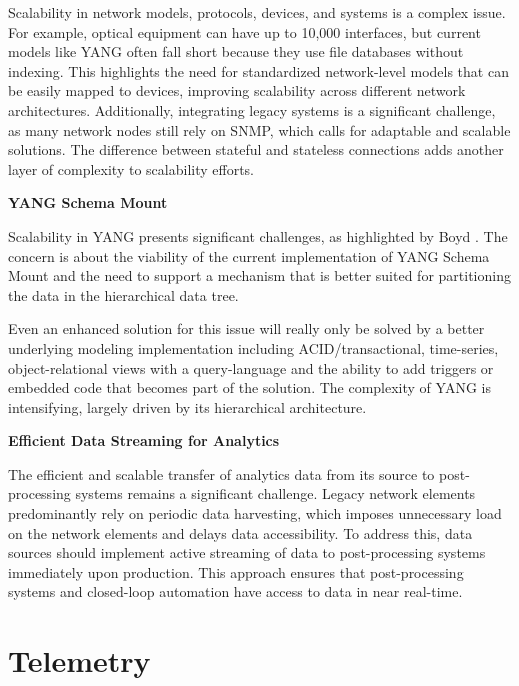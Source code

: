 \documentclass[10pt,sigconf]{iabart}
\begin{document}
Scalability in network models, protocols, devices, and systems is a complex issue. For example, optical equipment can have up to 10,000 interfaces, but current models like YANG often fall short because they use file databases without indexing. This highlights the need for standardized network-level models that can be easily mapped to devices, improving scalability across different network architectures. Additionally, integrating legacy systems is a significant challenge, as many network nodes still rely on SNMP, which calls for adaptable and scalable solutions. The difference between stateful and stateless connections adds another layer of complexity to scalability efforts.
 

\textbf{YANG Schema Mount}

Scalability in YANG presents significant challenges, as highlighted by Boyd \cite{boyd2023scalable}. The concern is about the viability of the current implementation of YANG Schema Mount \cite{RFC8528} and the need to support a mechanism that is better suited for partitioning the data in the hierarchical data tree.

Even an enhanced solution for this issue will really only be solved by a better underlying modeling implementation including ACID/transactional, time-series, object-relational views with a query-language and the ability to add triggers or embedded code that becomes part of the solution. The complexity of YANG is intensifying, largely driven by its hierarchical architecture.

\textbf{Efficient Data Streaming for Analytics}

The efficient and scalable transfer of analytics data from its source to post-processing systems remains a significant challenge. Legacy network elements predominantly rely on periodic data harvesting, which imposes unnecessary load on the network elements and delays data accessibility. To address this, data sources should implement active streaming of data to post-processing systems immediately upon production. This approach ensures that post-processing systems and closed-loop automation have access to data in near real-time.


\section{Telemetry} \label{telemetry}


\end{document}
